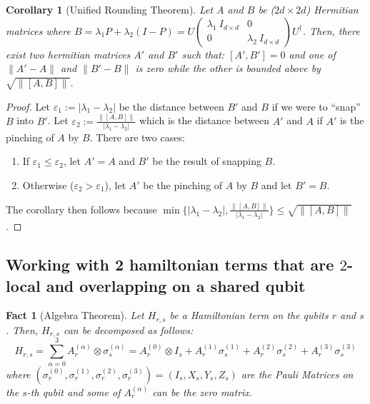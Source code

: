 \documentclass[11pt]{article}
\theoremstyle{plain}
\newtheorem{corollary}[theorem]{Corollary}
\newtheorem{fact}[theorem]{Fact}
\newcommand{\eps}{\varepsilon}
\begin{document}
\begin{corollary}[Unified Rounding Theorem]
    Let $A$ and $B$ be ($2d \times 2d$) Hermitian matrices where $B = \lambda_1 P + \lambda_2 (I - P) = U \begin{pmatrix}
        \lambda_1\: I_{d \times d} & 0\\ 0 & \lambda_2\: I_{d \times d}
    \end{pmatrix} U^\dagger$. Then, there exist two hermitian matrices $A'$ and $B'$ such that: $[A', B'] = 0$ and one of $\|A' - A\|$ and $\|B' - B \|$ is zero while the other is bounded above by $\sqrt{\|[A, B]\|}$.
\end{corollary}
\begin{proof}
    Let $\eps_1 := |\lambda_1 - \lambda_2|$ be the distance between $B'$ and $B$ if we were to ``snap'' $B$ into $B'$. Let $\eps_2 := \frac{\|[A, B]\|}{|\lambda_1 - \lambda_2|}$ which is the distance between $A'$ and $A$ if $A'$ is the pinching of $A$ by $B$.
    There are two cases:
    \begin{enumerate}
        \item If $\eps_1 \leq \eps_2$, let $A' = A$ and $B'$ be the result of snapping $B$.
        \item Otherwise ($\eps_2 > \eps_1$), let $A'$ be the pinching of $A$ by $B$ and let $B' = B$.
    \end{enumerate}
    The corollary then follows because $\min\{|\lambda_1 - \lambda_2|, \frac{\|[A, B]\|}{|\lambda_1 - \lambda_2|}\} \leq \sqrt{\|[A, B]\|}$.
\end{proof}

\subsection{Working with 2 hamiltonian terms that are $2$-local and overlapping on a shared qubit}

\begin{fact}[Algebra Theorem]\label{algebra-fact-pauli-decomposition}
    Let $H_{r,s}$ be a Hamiltonian term on the qubits $r$ and $s$. Then, $H_{r,s}$ can be decomposed as follows:
    \begin{equation}
        H_{r,s} = \sum\limits_{\alpha = 0}^{3} A_r^{(\alpha)} \otimes \sigma_s^{(\alpha)} = A_r^{(0)} \otimes I_s + A_r^{(1)} \sigma_s^{(1)} + A_r^{(2)} \sigma_s^{(
        2
        )} + A_r^{(3)} \sigma_s^{(3)}
    \end{equation}
where $\left(\sigma_r^{(0)}, \sigma_r^{(1)}, \sigma_r^{(2)}, \sigma_r^{(3)}\right) = \left(I_s, X_s, Y_s, Z_s\right)$ are the Pauli Matrices on the $s$-th qubit and some of $A_r^{(\alpha)}$ can be the zero matrix.
\end{fact}
\end{document}
